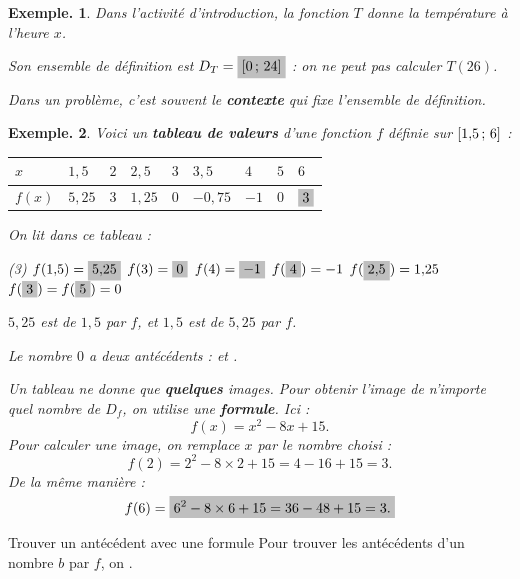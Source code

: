 \documentclass[12pt]{article}
\theoremstyle{break}
\newtheorem*{example}{Exemple.}
\begin{document}
\begin{example}
  Dans l'activité d'introduction, la fonction $T$ donne la température à l'heure $x$.

  Son ensemble de définition est $D_T = \hide{$\intff{0}{24}$}$ : on ne peut pas calculer $T(26)$.

  Dans un problème, c'est souvent le \textbf{contexte} qui fixe l'ensemble de définition.
\end{example}

\begin{example}
Voici un \textbf{tableau de valeurs} d'une fonction $f$ définie sur $\mathopen{[}1{,}5\,;\,6\mathclose{]}$ :

\begin{center}
\renewcommand{\arraystretch}{1.4}
\begin{tabularx}{\linewidth}{|Y|Y|Y|Y|Y|Y|Y|Y|Y|}
\hline
$x$ & $1{,}5$ & $2$ & $2{,}5$ & $3$ & $3{,}5$ & $4$ & $5$ & $6$ \\
\hline
$f(x)$ & $5{,}25$ & $3$ & $1{,}25$ & $0$ & $-0{,}75$ & $-1$ & $0$ & $\hideM{3}$ \\
\hline
\end{tabularx}
\end{center}

On lit dans ce tableau :

\begin{tasks}[label=\textbullet](3)
    \task $f(1{,}5) = \hideM{5{,}25}$
    \task $f(3) = \hideM{0}$
    \task $f(4) = \hideM{-1}$
    \task $f(\hideM{4}) = -1$
    \task $f(\hideM{2{,}5}) = 1{,}25$
    \task $f(\hideM{3}) = f(\hideM{5}) = 0$
\end{tasks}

\medskip
$5{,}25$ est  de $1{,}5$ par $f$, et $1{,}5$ est  de $5{,}25$ par $f$.

Le nombre $0$ a deux antécédents :  et .

\bigskip
Un tableau ne donne que \textbf{quelques} images. Pour obtenir l'image de n'importe quel nombre de $D_f$, on utilise une \textbf{formule}. Ici :
\[
  f(x) = x^2 - 8x + 15.
\]
Pour calculer une image, on remplace $x$ par le nombre choisi :
\[
  f(2) = 2^2 - 8 \times 2 + 15 = 4 - 16 + 15 = 3.
\]
De la même manière :
\[
  f(6) = \hideM{6^2 - 8 \times 6 + 15 = 36 - 48 + 15 = 3.}
\]
\end{example}

\begin{method}{Trouver un antécédent avec une formule}{}
  Pour trouver les antécédents d'un nombre $b$ par $f$, on .
\end{method}
\end{document}
